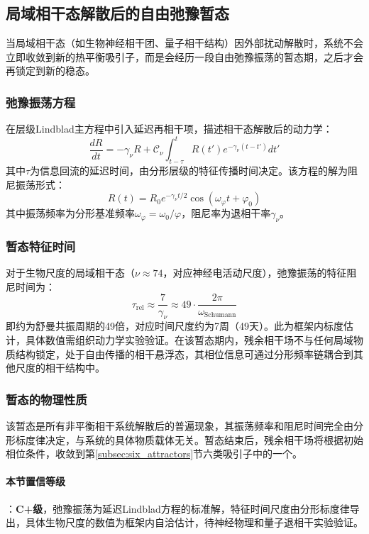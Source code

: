 \documentclass[12pt,a4paper,twocolumn]{article}
\renewcommand{\phi}{\varphi}
\begin{document}
\subsection{局域相干态解散后的自由弛豫暂态}
\label{subsec:relaxation_transient}
当局域相干态（如生物神经相干团、量子相干结构）因外部扰动解散时，系统不会立即收敛到新的热平衡吸引子，而是会经历一段自由弛豫振荡的暂态期，之后才会再锁定到新的稳态。

\subsubsection{弛豫振荡方程}
在层级Lindblad主方程中引入延迟再相干项，描述相干态解散后的动力学：
\begin{equation}
\frac{dR}{dt} = -\gamma_\nu R + \mathcal{C}_\nu \int_{t-\tau}^t R(t') e^{-\gamma_\nu (t-t')} dt'
\end{equation}
其中$\tau$为信息回流的延迟时间，由分形层级的特征传播时间决定。该方程的解为阻尼振荡形式：
\begin{equation}
R(t) = R_0 e^{-\gamma_\nu t/2} \cos(\omega_\phi t + \phi_0)
\end{equation}
其中振荡频率为分形基准频率$\omega_\phi = \omega_0/\phi$，阻尼率为退相干率$\gamma_\nu$。

\subsubsection{暂态特征时间}
对于生物尺度的局域相干态（$\nu\approx74$，对应神经电活动尺度），弛豫振荡的特征阻尼时间为：
\begin{equation}
\tau_{\text{rel}} \approx \frac{7}{\gamma_\nu} \approx 49 \cdot \frac{2\pi}{\omega_{\text{Schumann}}}
\end{equation}
即约为舒曼共振周期的49倍，对应时间尺度约为7周（49天）。此为框架内标度估计，具体数值需组织动力学实验验证。在该暂态期内，残余相干场不与任何局域物质结构锁定，处于自由传播的相干悬浮态，其相位信息可通过分形频率链耦合到其他尺度的相干结构中。

\subsubsection{暂态的物理性质}
该暂态是所有非平衡相干系统解散后的普遍现象，其振荡频率和阻尼时间完全由分形标度律决定，与系统的具体物质载体无关。暂态结束后，残余相干场将根据初始相位条件，收敛到第\ref{subsec:six_attractors}节六类吸引子中的一个。

\paragraph{本节置信等级}：\textbf{C+级}，弛豫振荡为延迟Lindblad方程的标准解，特征时间尺度由分形标度律导出，具体生物尺度的数值为框架内自洽估计，待神经物理和量子退相干实验验证。
\end{document}
